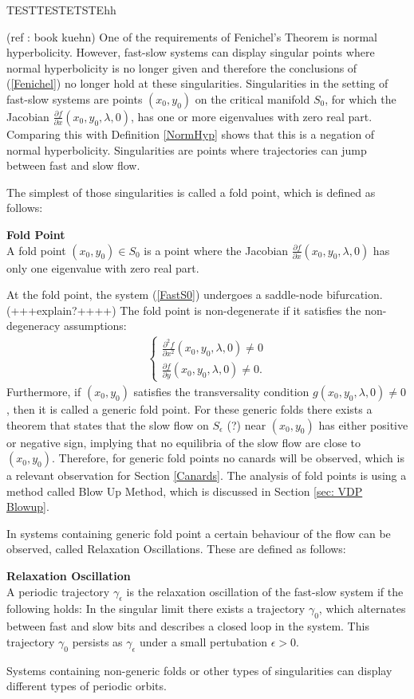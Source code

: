 TESTTESTETSTEhh

 (ref : book kuehn)
One of the requirements of Fenichel's Theorem is normal hyperbolicity. However, fast-slow systems can display singular points where normal hyperbolicity is no longer given and therefore the conclusions of (\ref{Fenichel}) no longer hold at these singularities.
Singularities in the setting of fast-slow systems are points $(x_0,y_0)$ on the critical manifold $S_0$, for which the Jacobian $ \frac{\partial f}{\partial x}(x_0,y_0, \lambda, 0)$, has one or more eigenvalues with zero real part. Comparing this with Definition \ref{NormHyp} shows that this is a negation of normal hyperbolicity. Singularities are points where trajectories can jump between fast and slow flow. 

The simplest of those singularities is called a fold point, which is defined as follows:
\begin{definition}{\textbf{Fold Point}} \label{FoldDef} \\
A fold point $(x_0,y_0) \in S_0$ is a point where the Jacobian $ \frac{\partial f}{\partial x}(x_0,y_0, \lambda, 0)$ has only one eigenvalue with zero real part.
\end{definition}
At the fold point, the system (\ref{FastS0}) undergoes a saddle-node bifurcation. (+++explain?++++)
The fold point is non-degenerate if it satisfies the non-degeneracy assumptions:
\begin{align} \label{NonDeg}
\begin{cases}
\frac{ \partial ^2 f}{ \partial x^2} (x_0,y_0, \lambda, 0) \neq 0 \\
\frac{\partial f}{\partial y}(x_0,y_0, \lambda, 0) \neq 0.
\end{cases}
\end{align}
Furthermore, if $(x_0,y_0)$ satisfies the transversality condition $g(x_0,y_0, \lambda, 0) \neq 0$, then it is called a generic fold point.
For these generic folds there exists a theorem that states that the slow flow on $S_\epsilon$ (?) near $(x_0,y_0)$ has either positive or negative sign, implying that no equilibria of the slow flow are close to $(x_0,y_0)$. Therefore, for generic fold points no canards will be observed, which is a relevant observation for Section \ref{Canards}.
The analysis of fold points is using a method called Blow Up Method, which is discussed in Section \ref{sec: VDP Blowup}.

In systems containing generic fold point a certain behaviour of the flow can be observed, called Relaxation Oscillations. These are defined as follows:
\begin{definition}{\textbf{Relaxation Oscillation}}\\
A periodic trajectory $\gamma_\epsilon$ is the relaxation oscillation of the fast-slow system if the following holds:
In the singular limit there exists a trajectory $\gamma_0$, which alternates between fast and slow bits and describes a closed loop in the system. This trajectory $\gamma_0$ persists as $\gamma_\epsilon$ under a small pertubation $\epsilon >0$.
\end{definition} 
Systems containing non-generic folds or other types of singularities can display different types of periodic orbits.
